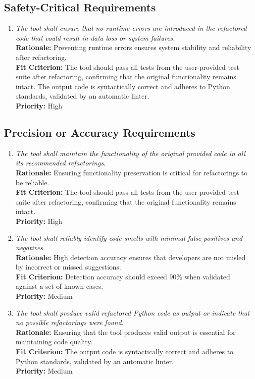 \documentclass[12pt]{article}
\begin{document}
\subsection{Safety-Critical Requirements}
\begin{enumerate}[label=PR-SCR \arabic*., wide=0pt, leftmargin=*]
    \item \emph{The tool shall ensure that no runtime errors are introduced in the refactored code that could result in data loss or system failures.}\\[2mm]
    {\bf Rationale:} Preventing runtime errors ensures system stability and reliability after refactoring.\\
    {\bf Fit Criterion:} The tool should pass all tests from the user-provided test suite after refactoring, confirming that the original functionality remains intact. The output code is syntactically correct and adheres to Python standards, validated by an automatic linter.\\
    {\bf Priority:} High
\end{enumerate}
\subsection{Precision or Accuracy Requirements}
\begin{enumerate}[label=PR-PAR \arabic*., wide=0pt, leftmargin=*]
    \item \emph{The tool shall maintain the functionality of the original provided code in all its recommended refactorings.}\\[2mm]
    {\bf Rationale:} Ensuring functionality preservation is critical for refactorings to be reliable.\\
    {\bf Fit Criterion:} The tool should pass all tests from the user-provided test suite after refactoring, confirming that the original functionality remains intact.\\
    {\bf Priority:} High
    \item \emph{The tool shall reliably identify code smells with minimal false positives and negatives.}\\[2mm]
    {\bf Rationale:} High detection accuracy ensures that developers are not misled by incorrect or missed suggestions.\\
    {\bf Fit Criterion:} Detection accuracy should exceed 90\% when validated against a set of known cases.\\
    {\bf Priority:} Medium
    \item \emph{The tool shall produce valid refactored Python code as output or indicate that no possible refactorings were found.}\\[2mm]
    {\bf Rationale:} Ensuring that the tool produces valid output is essential for maintaining code quality.\\
    {\bf Fit Criterion:} The output code is syntactically correct and adheres to Python standards, validated by an automatic linter.\\
    {\bf Priority:} Medium
\end{enumerate}
\end{document}
